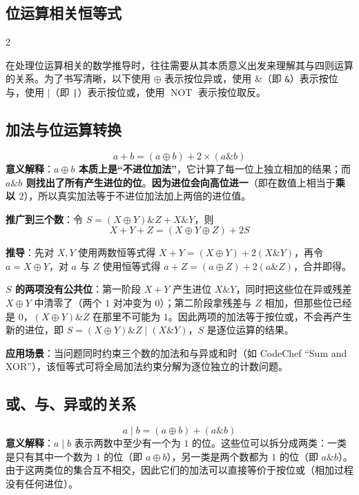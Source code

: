 	\begin{center}
		\section{位运算相关恒等式}
	\end{center}

	\begin{multicols*}{2}

		在处理位运算相关的数学推导时，往往需要从其本质意义出发来理解其与四则运算的关系。为了书写清晰，以下使用 $\oplus$ 表示按位异或，使用 $\mathbin{\&}$（即 \texttt{\&}）表示按位与，使用 $\mathbin{|}$（即 \texttt{|}）表示按位或，使用 $\operatorname{NOT}$ 表示按位取反。

		\subsection{加法与位运算转换}
		$$a + b = (a \oplus b) + 2 \times (a \mathbin{\&} b)$$
		\textbf{意义解释}：\textbf{$a \oplus b$ 本质上是“不进位加法”}，它计算了每一位上独立相加的结果；而 \textbf{$a \mathbin{\&} b$ 则找出了所有产生进位的位}。\textbf{因为进位会向高位进一}（即在数值上相当于\textbf{乘以 $2$}），所以真实加法等于不进位加法加上两倍的进位值。

		\textbf{推广到三个数}：令 $S = (X \oplus Y) \mathbin{\&} Z + X \mathbin{\&} Y$，则
		$$X + Y + Z = (X \oplus Y \oplus Z) + 2S$$

		\textbf{推导}：先对 $X, Y$ 使用两数恒等式得 $X + Y = (X \oplus Y) + 2(X \mathbin{\&} Y)$，再令 $a = X \oplus Y$，对 $a$ 与 $Z$ 使用恒等式得 $a + Z = (a \oplus Z) + 2(a \mathbin{\&} Z)$，合并即得。

		\textbf{$S$ 的两项没有公共位}：第一阶段 $X + Y$ 产生进位 $X \mathbin{\&} Y$，同时把这些位在异或残差 $X \oplus Y$ 中清零了（两个 $1$ 对冲变为 $0$）；第二阶段拿残差与 $Z$ 相加，但那些位已经是 $0$，$(X \oplus Y) \mathbin{\&} Z$ 在那里不可能为 $1$。因此两项的加法等于按位或，不会再产生新的进位，即 $S = (X \oplus Y) \mathbin{\&} Z \mathbin{|} (X \mathbin{\&} Y)$，$S$ 是逐位运算的结果。

		\textbf{应用场景}：当问题同时约束三个数的加法和与异或和时（如 CodeChef ``Sum and XOR''），该恒等式可将全局加法约束分解为逐位独立的计数问题。

		\subsection{或、与、异或的关系}
		$$a \mathbin{|} b = (a \oplus b) + (a \mathbin{\&} b)$$
		\textbf{意义解释}：$a \mathbin{|} b$ 表示两数中至少有一个为 $1$ 的位。这些位可以拆分成两类：一类是只有其中一个数为 $1$ 的位（即 $a \oplus b$），另一类是两个数都为 $1$ 的位（即 $a \mathbin{\&} b$）。由于这两类位的集合互不相交，因此它们的加法可以直接等价于按位或（相加过程没有任何进位）。


\end{multicols*}
